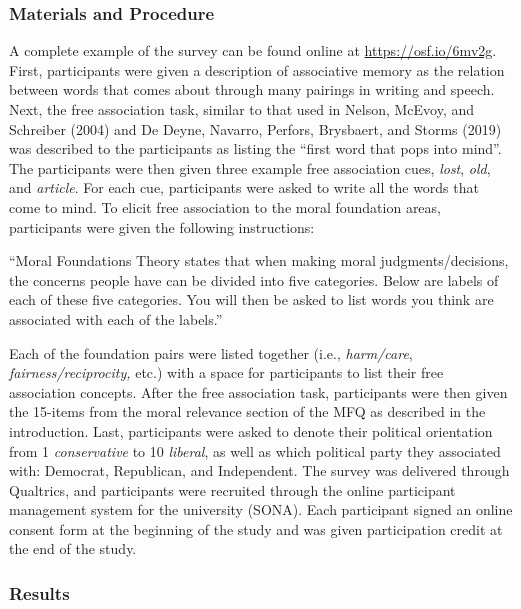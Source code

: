 \documentclass[
  man,floatsintext]{apa6}
\begin{document}
\subsubsection{Materials and Procedure}\label{materials-and-procedure}

A complete example of the survey can be found online at
\url{https://osf.io/6mv2g}. First, participants were given a description of
associative memory as the relation between words that comes about
through many pairings in writing and speech. Next, the free association
task, similar to that used in Nelson, McEvoy, and Schreiber (2004) and De Deyne, Navarro, Perfors, Brysbaert, and Storms (2019) was described
to the participants as listing the ``first word that pops into mind''. The
participants were then given three example free association cues,
\emph{lost}, \emph{old}, and \emph{article}. For each cue, participants were asked to
write all the words that come to mind. To elicit free association to the
moral foundation areas, participants were given the following
instructions:

``Moral Foundations Theory states that when making moral
judgments/decisions, the concerns people have can be divided into five
categories. Below are labels of each of these five categories. You will
then be asked to list words you think are associated with each of the
labels.''

Each of the foundation pairs were listed together (i.e., \emph{harm/care},
\emph{fairness/reciprocity,} etc.) with a space for participants to list
their free association concepts. After the free association task,
participants were then given the 15-items from the moral relevance
section of the MFQ as described in the introduction. Last, participants
were asked to denote their political orientation from 1 \emph{conservative}
to 10 \emph{liberal}, as well as which political party they associated with:
Democrat, Republican, and Independent. The survey was delivered through
Qualtrics, and participants were recruited through the online
participant management system for the university (SONA). Each
participant signed an online consent form at the beginning of the study
and was given participation credit at the end of the study.

\subsubsection{Results}\label{results}
\end{document}
